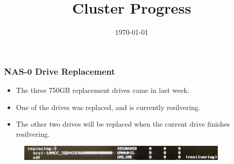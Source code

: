\documentclass{beamer}
\title{Cluster Progress}
\date{\today}
\begin{document}

\begin{frame}
  \maketitle
\end{frame}



\begin{frame}
  \frametitle{NAS-0 Drive Replacement}

  \begin{itemize}
    
  \item The three 750GB replacement drives came in last week.
  \item One of the drives was replaced, and is currently resilvering. 
  \item The other two drives will be replaced when the current drive finishes resilvering. 

  \end{itemize}

  \begin{figure}[H]
    \begin{center}
      \includegraphics[width=0.9\textwidth]{nas0_drive_replacement_20190415.jpg}
    \end{center}
  \end{figure}

\end{frame}

\end{document}
